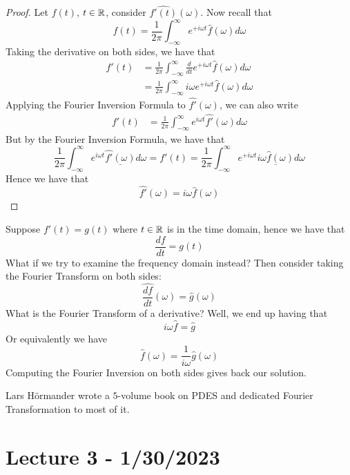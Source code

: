 \documentclass{article}
\begin{document}
\begin{proof}
    Let $f(t)$, $t \in \mathbb{R}$, consider $\hat{f'(t)}(\omega)$. Now recall that
        \[f(t) = \frac{1}{2\pi} \int_{-\infty}^\infty e^{+i\omega t} \hat{f}(\omega) d\omega\]
        Taking the derivative on both sides, we have that
        \begin{align*}
            f'(t) &= \frac{1}{2\pi}\int_{-\infty}^\infty \frac{d}{dt} e^{+i\omega t} \hat{f}(\omega) d\omega\\
            &= \frac{1}{2\pi}\int_{-\infty}^\infty i \omega e^{+i\omega t} \hat{f}(\omega) d\omega
        \end{align*}
        Applying the Fourier Inversion Formula to $\hat{f'}(\omega)$, we can also write
        \begin{align*}
            f'(t) &= \frac{1}{2\pi} \int_{-\infty}^\infty e^{i \omega t}  \hat{f'}(\omega) d\omega
        \end{align*}
        But by the Fourier Inversion Formula, we have that
        \[\frac{1}{2\pi} \int_{-\infty}^\infty e^{i \omega t} \underline{\hat{f'}(\omega)} d\omega = f'(t) = \frac{1}{2\pi}\int_{-\infty}^\infty e^{+i\omega t} \underline{i \omega \hat{f}(\omega)} d\omega\]
    Hence we have that
    \[\hat{f'}(\omega) = i \omega \hat{f}(\omega)\]
\end{proof}

\begin{example}
    Suppose $f'(t) = g(t)$ where $t \in \mathbb{R}$ is in the time domain, hence we have that
    \[\frac{df}{dt} = g(t)\]
    What if we try to examine the frequency domain instead? Then consider taking the Fourier Transform on both sides:
    \[\hat{\frac{df}{dt}}(\omega) = \hat{g}(\omega)\]
    What is the Fourier Transform of a derivative? Well, we end up having that
    \[i \omega \hat{f} = \hat{g}\]
    Or equivalently we have
    \[\hat{f}(\omega) = \frac{1}{i\omega} \hat{g}(\omega)\]
    Computing the Fourier Inversion on both sides gives back our solution.
\end{example}

\begin{remark}
    Lars Hörmander wrote a $5$-volume book on PDES and dedicated Fourier Transformation to most of it.
\end{remark}

\newpage
\section{Lecture 3 - 1/30/2023}
\end{document}
